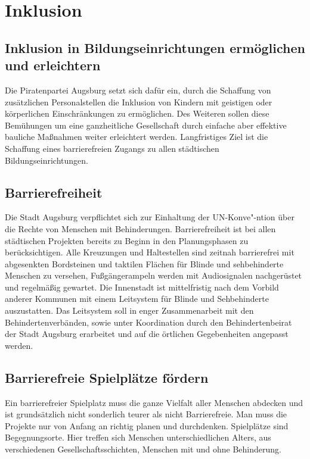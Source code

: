 \chapter{Inklusion}

  \section{Inklusion in Bildungseinrichtungen ermöglichen und erleichtern}
  
  Die Piratenpartei Augsburg setzt sich dafür ein, durch die Schaffung von 
  zusätzlichen Personalstellen die Inklusion von Kindern mit geistigen oder 
  körperlichen Einschränkungen zu ermöglichen. Des Weiteren sollen diese 
  Bemühungen um eine ganzheitliche Gesellschaft durch einfache aber effektive 
  bauliche Maßnahmen weiter erleichtert werden. Langfristiges Ziel ist die 
  Schaffung eines barrierefreien Zugangs zu allen städtischen 
  Bildungseinrichtungen.
  
  \section{Barrierefreiheit}
  
  Die Stadt Augsburg verpflichtet sich zur Einhaltung der UN-Konve"-ntion über 
  die Rechte von Menschen mit Behinderungen. Barrierefreiheit ist bei allen 
  städtischen Projekten bereits zu Beginn in den Planungsphasen zu 
  berücksichtigen. Alle Kreuzungen und Haltestellen sind zeitnah barrierefrei 
  mit abgesenkten Bordsteinen und taktilen Flächen für Blinde und sehbehinderte 
  Menschen zu versehen, Fußgängerampeln werden mit Audiosignalen nachgerüstet\\
  und regelmäßig gewartet. Die Innenstadt ist mittelfristig nach dem Vorbild 
  anderer Kommunen mit einem Leitsystem für Blinde und Sehbehinderte 
  auszustatten. Das Leitsystem soll in enger Zusammenarbeit mit den 
  Behindertenverbänden, sowie unter Koordination durch den Behindertenbeirat 
  der Stadt Augsburg erarbeitet und auf die örtlichen Gegebenheiten angepasst 
  werden.
  
  \section{Barrierefreie Spielplätze fördern}
  
  Ein barrierefreier Spielplatz muss die ganze Vielfalt aller Menschen 
  abdecken und ist grundsätzlich nicht sonderlich teurer als nicht   
  Barrierefreie. Man muss die Projekte nur von Anfang an richtig planen und 
  durchdenken. Spielplätze sind Begegnungsorte. Hier treffen sich Menschen 
  unterschiedlichen Alters, aus verschiedenen Gesellschaftsschichten, Menschen 
  mit und ohne Behinderung.
  
